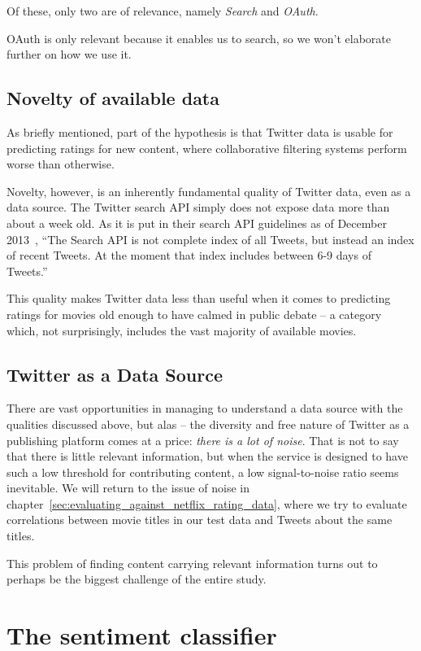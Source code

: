 Of these, only two are of relevance, namely \emph{Search} and \emph{OAuth}.

OAuth is only relevant because it enables us to search, so we won't elaborate further on how we use it.


\subsection{Novelty of available data} %
\label{sub:novelty_of_available_data}

As briefly mentioned, part of the hypothesis is that Twitter data is usable for predicting ratings for new content, where collaborative filtering systems perform worse than otherwise.

Novelty, however, is an inherently fundamental quality of Twitter data, even as a data source.
The Twitter search API simply does not expose data more than about a week old.
As it is put in their search API guidelines as of December 2013~\cite{UsingTwitterSearchAPI}, ``The Search API is not complete index of all Tweets, but instead an index of recent Tweets. At the moment that index includes between 6-9 days of Tweets.''

This quality makes Twitter data less than useful when it comes to predicting ratings for movies old enough to have calmed in public debate -- a category which, not surprisingly, includes the vast majority of available movies.


\subsection{Twitter as a Data Source} %
\label{sub:twitter_as_a_data_source}

There are vast opportunities in managing to understand a data source with the qualities discussed above, but alas -- the diversity and free nature of Twitter as a publishing platform comes at a price: \emph{there is a lot of noise}.
That is not to say that there is little relevant information, but when the service is designed to have such a low threshold for contributing content, a low signal-to-noise ratio seems inevitable.
We will return to the issue of noise in chapter~\ref{sec:evaluating_against_netflix_rating_data}, where we try to evaluate correlations between movie titles in our test data and Tweets about the same titles.

This problem of finding content carrying relevant information turns out to perhaps be the biggest challenge of the entire study.



\section{The sentiment classifier} %
\label{sec:the_sentiment_classifier}



